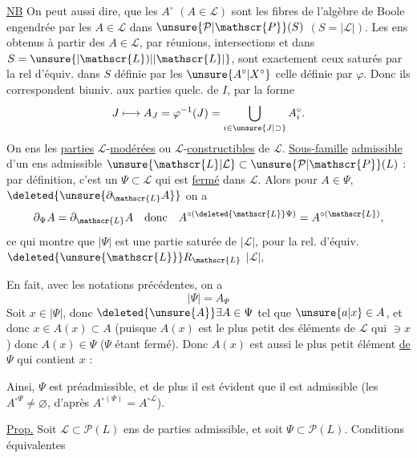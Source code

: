 \uline{NB} On peut aussi dire,  que les $A^\circ$ $(A\in\mathscr{L})$ sont les  fibres de l'algèbre de Boole engendrée par les $A\in\mathscr{L}$ dans $\unsure{\mathcal{P}|\mathscr{P}}(S)$ $(S=|\mathscr{L}|)$. Les ens obtenus à partir des $A\in\mathscr{L}$, par réunions, intersections et  dans $S=\unsure{\lvert\mathscr{L})|\lvert\mathscr{L}\rvert}$, sont exactement ceux saturés par la rel d'équiv. dans $S$ définie par les $\unsure{A^\circ|X^\circ}$  celle définie par $\varphi$. Donc ils correspondent biuniv. aux parties quelc. de $I$, par la forme
\[
 J\longmapsto A_J=\varphi^{-1}(J)=\bigcup_{i\in\unsure{J|\supset}}A_i^\circ .
\]
On   ens  les \uline{parties} $\mathscr{L}$-\uline{modérées} ou $\mathscr{L}$-\uline{constructibles} de $\mathscr{L}$.
 \uline{Sous-famille}  \uline{admissible} d'un ens admissible $\unsure{\mathscr{L}|\mathcal{L}}\subset\unsure{\mathcal{P}|\mathscr{P}}(L)$ : par définition, c'est un $\Psi\subset\mathscr{L}$ qui est \uline{fermé} dans $\mathscr{L}$. Alors pour $A\in\Psi$, $\deleted{\unsure{\partial_{\mathscr{L}}A}}$ on a
\[
 \partial_{\Psi}A=\partial_{\mathscr{L}}A\quad\text{donc}\quad
 A^{\circ(\deleted{\mathscr{L}}\Psi)}=A^{\circ(\mathscr{L})},
\]
ce qui montre que $|\Psi|$ est une partie saturée de $|\mathscr{L}|$, pour la rel. d'équiv. $\deleted{\unsure{\mathscr{L}}}R_{\mathscr{L}}$  $|\mathscr{L}|$,

En fait, avec les notations précédentes, on a
\[
 |\Psi|=A_\Psi
\]
 Soit $x\in|\Psi|$, donc $\deleted{\unsure{A}}\exists A\in\Psi$ tel que $\unsure{a|x}\in A$,  et donc $x\in A(x)\subset A$ (puisque $A(x)$ est le plus petit des éléments de $\mathscr{L}$ qui $\ni x$) donc $A(x)\in\Psi$ ($\Psi$ étant fermé). Donc $A(x)$ est aussi le plus petit élément \uline{de $\Psi$} qui contient $x$ :

 Ainsi, $\Psi$ est préadmissible, et de plus il est évident que il est admissible (les $A^{\circ\Psi}\ne\varnothing$, d'après $A^{\circ(\Psi)}=A^{\circ\mathscr{L}}$).

\uline{Prop.} Soit $\mathscr{L}\subset\mathcal{P}(L)$ ens de parties admissible, et soit $\Psi\subset\mathcal{P}(L)$. Conditions équivalentes

